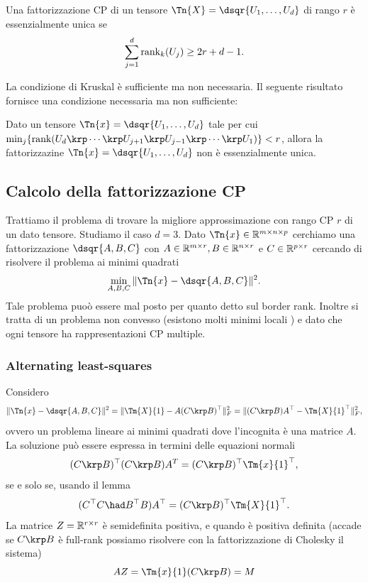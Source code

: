 \begin{theorem}
  Una fattorizzazione CP di un tensore $ \Tn{X} = \dsqr{U_1, \ldots, U_d}$ di rango $ r $ è essenzialmente unica se
  \begin{equation*}
    \sum_{j=1}^d \text{rank}_k(U_j) \ge 2r + d -1.
  \end{equation*}
\end{theorem}

La condizione di Kruskal è sufficiente ma non necessaria. Il seguente risultato fornisce una
condizione necessaria ma non sufficiente:

\begin{theorem}
  Dato un tensore $ \Tn{x} = \dsqr{U_1, \ldots, U_d}$ tale per cui $ \min_j \left\{ \rk(U_d \krp
  \cdots \krp U_{j+1} \krp U_{j-1} \krp \cdots \krp U_1) \right\} < r$, allora la fattorizzazine $ \Tn{x} =
  \dsqr{U_1, \ldots, U_d} $ non è essenzialmente unica.
\end{theorem}

\subsection{Calcolo della fattorizzazione CP}

Trattiamo il problema di trovare la migliore approssimazione con rango CP $ r $ di un dato tensore.
Studiamo il caso $ d = 3 $.
Dato $ \Tn{x} \in \R ^ {m \times n \times p} $ cerchiamo una fattorizzazione $ \dsqr{A, B, C} $ con
$ A \in \mathbb{R}^{m \times r}, B \in \mathbb{R}^{n\times r} $ e $ C \in \mathbb{R}^{p \times r} $ cercando di risolvere il
problema ai minimi quadrati
\begin{equation}
  \min_{A,B,C}\| \Tn{x} - \dsqr{A,B,C}\|^2.
\end{equation}
Tale problema puoò essere mal posto per quanto detto sul border rank. Inoltre si tratta di un
problema non convesso (esistono molti minimi locali ) e dato che ogni tensore ha
rappresentazioni CP multiple.

\subsubsection{Alternating least-squares}

Considero 
\[
\| \Tn{x} - \dsqr{A,B,C}\|^2 = \| \Tm{X}{1} - A(C \krp B)^{\top}\|_F^2 = \| (C \krp B)A^{\top} -
\Tm{X}{1}^{\top}\|_F^2
,\] 
ovvero un problema lineare ai minimi quadrati dove l'incognita è una matrice $ A $.
La soluzione può essere espressa  in termini delle equazioni normali
\[
  (C \krp B)^{\top}(C \krp B)A^T = (C \krp B)^{\top}\Tm{x}{1}^{\top}
,\] 
se e solo se, usando il lemma 
\[
  (C^{\top}C \had B^{\top}B)A^{\top} = (C \krp B)^{\top}\Tm{X}{1}^{\top}
.\] 
La matrice $ Z = \mathbb{R}^{r\times r} $ è semidefinita positiva, e quando è positiva definita (accade se
$ C \krp B $ è full-rank possiamo risolvere con la fattorizzazione di Cholesky il sistema)
\begin{equation}
  AZ = \Tm{x}{1}(C\krp B)= M
\end{equation}
